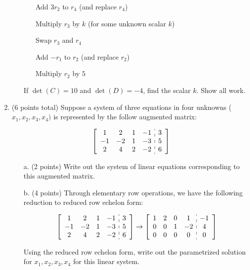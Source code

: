 \documentclass[12pt]{extarticle}
\begin{document}
\begin{enumerate}
\begin{itemize}
  
  \begin{itemize}
  \item[]  Add $3r_2$ to $r_4$ (and replace $r_4$)
    \item[]  Multiply $r_3$ by $k$ (for some unknown scalar $k$)
    \item[]  Swap $r_3$ and $r_4$
  \item[] Add $-r_1$ to $r_2$ (and replace $r_2$)
  \item[]  Multiply $r_2$ by $5$
  \end{itemize}

If $\det(C)=10$ and $\det(D)=-4$, find the scalar $k$. Show all work.
\end{itemize}

 
    \newpage






\item (6 points total) Suppose a system of three equations in four unknowns ($x_1,x_2,x_3,x_4)$ is represented by the follow augmented matrix:

\[\left[\begin{array}{cccc:c}
1 & 2 & 1 & -1 & 3 
\\
 -1 & -2 & 1 & -3 & 5 
\\
 2 & 4 & 2 & -2 & 6 
\end{array}\right]\]
  
 \begin{itemize}
        \item[a.] (2 points) Write out the system of linear equations corresponding to this augmented matrix.

  \vspace{2in}
  
  \item[b.] (4 points) Through elementary row operations, we have the following reduction to reduced row echelon form:

  \[\left[\begin{array}{cccc:c}
1 & 2 & 1 & -1 & 3 
\\
 -1 & -2 & 1 & -3 & 5 
\\
 2 & 4 & 2 & -2 & 6 
\end{array}\right]\to \left[\begin{array}{cccc:c}
1 & 2 & 0 & 1 & -1 
\\
 0 & 0 & 1 & -2 & 4 
\\
 0 & 0 & 0 & 0 & 0 
\end{array}\right]
\]

Using the reduced row echelon form, write out the parametrized solution for $x_1, x_2, x_3, x_4$ for this linear system.
\end{itemize}        
     


\end{enumerate}
\end{document}
